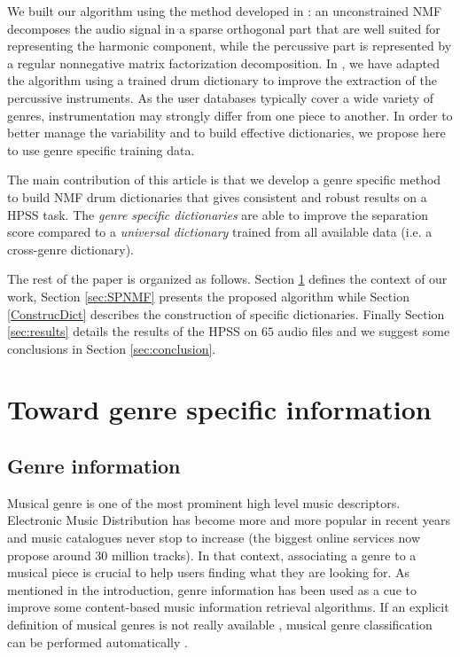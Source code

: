 \documentclass{article}
\begin{document}
We built our algorithm using the method developed in \cite{laroche2015structured}: an unconstrained NMF decomposes the audio signal in a sparse orthogonal part that are well suited for representing the harmonic component, while the percussive part is represented by a regular nonnegative matrix factorization decomposition. In \cite{larocheJournal}, we have adapted the algorithm using a trained drum dictionary to improve the extraction of the percussive instruments. As the user databases typically cover a wide variety of genres, instrumentation may strongly differ from one piece to another. In order to better manage the variability and to build effective dictionaries, we propose here to use genre specific training data.

The main contribution of this article is that we develop a genre specific method to build NMF drum dictionaries that gives consistent and robust results on a HPSS task. The \emph{genre specific dictionaries} are able to improve the separation score compared to a \emph{universal dictionary} trained from all available data (i.e. a cross-genre dictionary). 


The rest of the paper is organized as follows. Section \ref{defgenre} defines the context of our work, Section \ref{sec:SPNMF} presents the proposed algorithm while Section \ref{ConstrucDict} describes the construction of specific dictionaries. Finally Section \ref{sec:results} details the results of the HPSS on $65$ audio files and  we suggest some conclusions in Section \ref{sec:conclusion}. 



\section{Toward genre specific information}\label{defgenre}

\subsection{Genre information}

Musical genre is one of the most prominent high level music descriptors. Electronic Music Distribution has become more and more popular in recent years and music catalogues never stop to increase (the biggest online services now propose around 30 million tracks). In that context, associating a genre to a musical piece is crucial to help users finding what they are looking for. As mentioned in the introduction, genre information has been used as a cue to improve some content-based music information retrieval algorithms. If an explicit definition of musical genres is not really available \cite{aucouturier2003representing}, musical genre classification can be performed automatically \cite{li2003comparative}.
\end{document}
